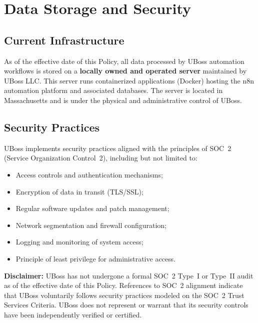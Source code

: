 \documentclass[11pt, letterpaper]{article}
\begin{document}
\section{Data Storage and Security}

\subsection{Current Infrastructure}

As of the effective date of this Policy, all data processed by UBoss automation
workflows is stored on a \textbf{locally owned and operated server} maintained by
UBoss LLC. This server runs containerized applications (Docker) hosting the n8n
automation platform and associated databases. The server is located in Massachusetts
and is under the physical and administrative control of UBoss.

\subsection{Security Practices}

UBoss implements security practices aligned with the principles of SOC~2 (Service
Organization Control~2), including but not limited to:

\begin{itemize}
    \item Access controls and authentication mechanisms;
    \item Encryption of data in transit (TLS/SSL);
    \item Regular software updates and patch management;
    \item Network segmentation and firewall configuration;
    \item Logging and monitoring of system access;
    \item Principle of least privilege for administrative access.
\end{itemize}

\begin{tcolorbox}[keyhighlight]
\textbf{Disclaimer:} UBoss has not undergone a formal SOC~2 Type~I or Type~II audit as
of the effective date of this Policy. References to SOC~2 alignment indicate that UBoss
voluntarily follows security practices modeled on the SOC~2 Trust Services Criteria.
UBoss does not represent or warrant that its security controls have been independently
verified or certified.
\end{tcolorbox}
\end{document}
